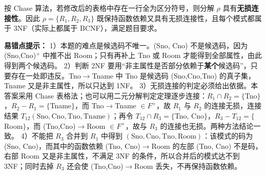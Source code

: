 \documentclass[a4paper,11pt]{article}
\begin{document}
按 Chase 算法，若修改后的表格中存在一行全为区分符号，则分解 $\rho$ 具有\textbf{无损连接性}。因此 $\rho=\{R_1,R_2,R_3\}$ 既保持函数依赖又具有无损连接性，且每个模式都属于 3NF（实际上都属于 BCNF），满足题目要求。

\begin{analysis}
\textbf{易错点提示：}
1）本题的难点是候选码不唯一。(Sno, Cno) 不是候选码，因为 (Sno,Cno)$^{+}$ 中推不出 Room；只有再补上 Tno 或 Room 才能得到全部属性，由此得到两个候选码。
2）判断 2NF 要用“非主属性是否部分依赖于\textbf{某个}候选码”，只要存在一处即违反。Tno$\to$Tname 中 Tno 是候选码 (Sno,Cno,Tno) 的真子集，Tname 又是非主属性，所以只达到 1NF。
3）无损连接的判定必须给出依据。本答案采用 Chase 表格法；也可以用二元分解判定定理逐步连接：$R_1\cap R_2=\{$Tno$\}$，$R_2-R_1=\{$Tname$\}$，而 Tno$\to$Tname $\in F^{+}$，故 $R_1$ 与 $R_2$ 的连接无损，连接结果 $T_{12}(\text{Sno},\text{Cno},\text{Tno},\text{Tname})$；再令 $T_{12}\cap R_3=\{$Tno, Cno$\}$，$R_3-T_{12}=\{$Room$\}$，而 (Tno,Cno)$\to$Room $\in F^{+}$，故与 $R_3$ 的连接也无损。两种方法结论一致。
4）不能把 $R_3$ 合并到 $R_1$ 中得到 $(\text{Sno},\text{Cno},\text{Tno},\text{Room})$：该模式的码为 (Sno, Cno)，而其中的函数依赖 (Tno, Cno)$\to$Room 的左部 (Tno, Cno) 不是码，右部 Room 又是非主属性，不满足 3NF 的条件，所以合并后的模式达不到 3NF；同时去掉 $R_3$ 还会使 (Tno,Cno)$\to$Room 丢失，不再保持函数依赖。
\end{analysis}
\end{document}
